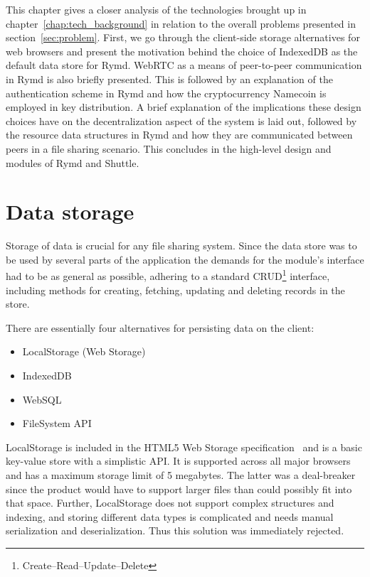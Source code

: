 This chapter gives a closer analysis of the technologies brought up in chapter~\ref{chap:tech_background} in relation to the overall problems presented in section~\ref{sec:problem}. First, we go through the client-side storage alternatives for web browsers and present the motivation behind the choice of IndexedDB as the default data store for Rymd. WebRTC as a means of peer-to-peer communication in Rymd is also briefly presented. This is followed by an explanation of the authentication scheme in Rymd and how the cryptocurrency Namecoin is employed in key distribution. A brief explanation of the implications these design choices have on the decentralization aspect of the system is laid out, followed by the resource data structures in Rymd and how they are communicated between peers in a file sharing scenario. This concludes in the high-level design and modules of Rymd and Shuttle.


\section{Data storage}
\label{sec:datastorage}
Storage of data is crucial for any file sharing system. Since the data store was to be used by several parts of the application the demands for the module's interface had to be as general as possible, adhering to a standard CRUD\footnote{Create–Read–Update–Delete} interface, including methods for creating, fetching, updating and deleting records in the store.

There are essentially four alternatives for persisting data on the client:

\begin{itemize}
\item LocalStorage (Web Storage)
\item IndexedDB
\item WebSQL
\item FileSystem API
\end{itemize}

LocalStorage is included in the HTML5 Web Storage specification~\cite{WebStorage:Online} and is a basic key-value store with a simplistic API. It is supported across all major browsers and has a maximum storage limit of 5 megabytes. The latter was a deal-breaker since the product would have to support larger files than could possibly fit into that space. Further, LocalStorage does not support complex structures and indexing, and storing different data types is complicated and needs manual serialization and deserialization. Thus this solution was immediately rejected.


